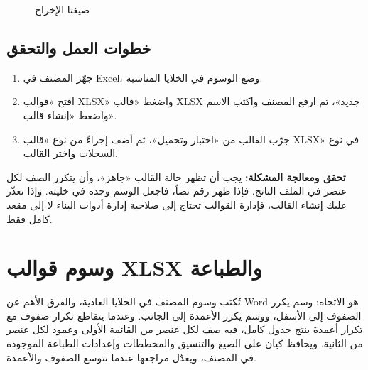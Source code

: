 \begin{figure}[H]
\centering
{}
\rclegend
\caption{صيغتا الإخراج}
\label{fig:builder-xlsx-outputs}
\end{figure}

\subsection{خطوات العمل والتحقق}
\begin{enumerate}
\item جهّز المصنف في Excel، وضع الوسوم في الخلايا المناسبة.
\item افتح «قوالب XLSX» واضغط «قالب XLSX جديد»، ثم ارفع المصنف واكتب الاسم واضغط «إنشاء قالب».
\item جرّب القالب من «اختبار وتحميل»، ثم أضف إجراءً من نوع «قالب XLSX» في نوع السجلات واختر القالب.
\end{enumerate}

\textbf{تحقق ومعالجة المشكلة:} يجب أن تظهر حالة القالب «جاهز»، وأن يتكرر الصف لكل عنصر في الملف الناتج. فإذا ظهر رقم نصاً، فاجعل الوسم وحده في خليته. وإذا تعذّر عليك إنشاء القالب، فإدارة القوالب تحتاج إلى صلاحية إدارة أدوات البناء لا إلى مقعد كامل فقط.

\clearpage
\section{وسوم قوالب XLSX والطباعة}
\label{sec:builder-feature-xlsx-tags}

تُكتب وسوم المصنف في الخلايا العادية، والفرق الأهم عن Word هو الاتجاه: وسم  يكرر الصفوف إلى الأسفل، ووسم  يكرر الأعمدة إلى الجانب. وعندما يتقاطع تكرار صفوف مع تكرار أعمدة ينتج جدول كامل، فيه صف لكل عنصر من القائمة الأولى وعمود لكل عنصر من الثانية. ويحافظ كيان على الصيغ والتنسيق والمخططات وإعدادات الطباعة الموجودة في المصنف، ويعدّل مراجعها عندما تتوسع الصفوف والأعمدة.

